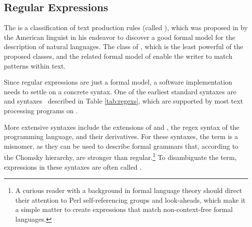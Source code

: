 \subsection{Regular Expressions}\label{sec:regexs}
The  is a classification of text production rules
(called ), which was proposed \cite{chomsky56} in
\citeyear{chomsky56} by the American linguist  in his
endeavor to discover a good formal model for the description of natural
languages. The class of , which is the least powerful
of the proposed classes, and the related formal model of  enable the writer to match patterns within text.

Since regular expressions are just a formal model, a software implementation
needs to settle on a concrete syntax. One of the earliest standard syntaxes are
 and  syntaxes~\cite[part~1,~ch.\,9]{iso93:posix2}
described in Table \ref{tab:regexs}, which are supported by most text processing
programs on \Unices.

More extensive syntaxes include the  extensions of 
and , the regex syntax of the  programming language, and
their derivatives. For these syntaxes, the term  is a misnomer,
as they can be used to describe formal grammars that, according to the Chomsky
hierarchy, are stronger than regular.\footnote{
  A curious reader with a background in formal language theory should direct
  their attention to Perl self-referencing groups and look-aheads, which make it
  a simple matter to create expressions that match non-context-free formal
  languages.
} To disambiguate the term, expressions in these syntaxes are often called
.

\begin{table}
  
  \label{tab:regexs}
\end{table}


